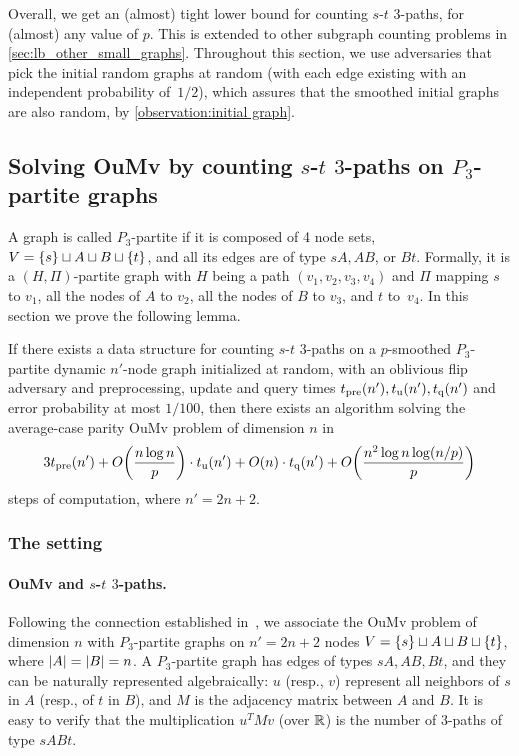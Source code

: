 \documentclass[letter,11pt]{article}
\newcommand{\oumv}{\textnormal{\textsf{OuMv}}\xspace}
\newcommand{\paths}[3]{${#1}$-${#2}$ ${#3}$-paths\xspace}
\newcommand{\tp}{t_{\textnormal{pre}}}
\newcommand{\tu}{t_{\textnormal{u}}}
\newcommand{\tq}{t_{\textnormal{q}}}
\begin{document}
Overall, we get an (almost) tight lower bound for counting \paths{s}{t}{3}, for (almost) any value of $p$.
This is extended to other subgraph counting problems in \cref{sec:lb_other_small_graphs}. 
Throughout this section, we use adversaries that pick the initial random graphs at random (with each edge existing with an independent probability of~$1/2$), which assures that the smoothed initial graphs are also random, by \cref{observation:initial graph}.


\subsection{Solving OuMv by counting \paths{s}{t}{3} on $P_3$-partite graphs}
\label{sec:lb:ac_oumv_to_restricted_graphs}

A graph is called $P_3$-partite if it is composed of 4 node sets, $V = \{s\} \sqcup A \sqcup B \sqcup \{t\}$,
and all its edges are of type $sA, AB$, or $Bt$.
Formally, it is a $(H,\Pi)$-partite graph with $H$ being a path $(v_1,v_2,v_3,v_4)$ and $\Pi$ mapping $s$ to $v_1$, all the nodes of $A$ to $v_2$, all the nodes of $B$ to $v_3$, and $t$ to~$v_4$.
In this section we prove the following lemma.

\begin{lemma}
    \label{lem:ac_oumv_to_restricted_graphs}
    If there exists a data structure for counting \paths{s}{t}{3} on a $p$-smoothed $P_3$-partite dynamic $n'$-node graph initialized at random, with an oblivious flip adversary and  preprocessing, update and query times $\tp(n'), \tu(n'), \tq(n')$ and error probability at most $1/100$, then there exists an algorithm solving the average-case parity \oumv problem of dimension $n$ in
    \[
        3\tp(n') + O\left(\frac{n \log n}{p}\right) \cdot \tu(n') + O(n) \cdot \tq(n') + O\left(\frac{n^2 \log n \log(n/p)}{p}\right) 
    \]
    steps of computation, where $n' = 2n+2$.
\end{lemma}

 
\subsubsection{The setting}
 
\paragraph{\oumv and \paths{s}{t}{3}.} 
Following the connection established in~\cite{HenzingerKNS15}, 
we associate the \oumv problem of dimension $n$ with $P_3$-partite graphs on $n' = 2n+2$ nodes $V = \{s\} \sqcup A \sqcup B \sqcup \{t\}$, where $\card{A} = \card{B} = n$.
A $P_3$-partite graph has edges of types $sA, AB, Bt$, and they can be naturally represented algebraically: 
$u$ (resp., $v$) represent all neighbors of $s$ in $A$ (resp., of $t$ in $B$), and $M$ is the adjacency matrix between $A$ and $B$.
It is easy to verify that the multiplication $u^T M v$ (over $\mathbb{R}$) is the number of $3$-paths of type $sABt$.
\end{document}
